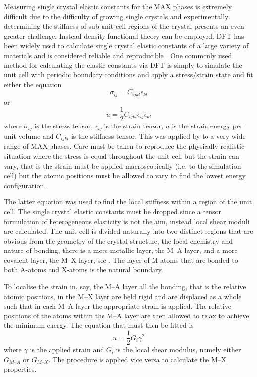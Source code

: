 Measuring single crystal elastic constants for the MAX phases is extremely difficult due to the difficulty of growing single crystals and experimentally determining the stiffness of sub-unit cell regions of the crystal presents an even greater challenge. Instead density functional theory can be employed. DFT has been widely used to calculate single crystal elastic constants of a large variety of materials and is considered reliable and reproducible \cite{Lejaeghere2016}. One commonly used method for calculating the elastic constants via DFT is simply to simulate the unit cell with periodic boundary conditions and apply a stress/strain state and fit either the equation
\begin{equation}
\sigma_{ij} = C_{ijkl} \epsilon_{kl}
\end{equation}
or 
\begin{equation}
u = \frac{1}{2} C_{ijkl} \epsilon_{ij} \epsilon_{kl}
\end{equation}
where $\sigma_{ij}$ is the stress tensor, $\epsilon_{ij}$ is the strain tensor, $u$ is the strain energy per unit volume and $C_{ijkl}$ is the stiffness tensor. This was applied by \citet{Aryal2014} to a very wide range of MAX phases. Care must be taken to reproduce the physically realistic situation where the stress is equal throughout the unit cell but the strain can vary, that is the strain must be applied macroscopically (i.e. to the simulation cell) but the atomic positions must be allowed to vary to find the lowest energy configuration.

The latter equation was used to find the local stiffness within a region of the unit cell. The single crystal elastic constants must be dropped since a tensor formulation of heterogeneous elasticity is not the aim, instead local shear moduli are calculated. The unit cell is divided naturally into two distinct regions that are obvious from the geometry of the crystal structure, the local chemistry and nature of bonding, there is a more metallic layer, the M--A layer, and a more covalent layer, the M--X layer, see \label{fig:fig:MAX_unit_cells}. The layer of M-atoms that are bonded to both A-atoms and X-atoms is the natural boundary.

To localise the strain in, say, the M--A layer all the bonding, that is the relative atomic positions, in the M--X layer are held rigid and are displaced as a whole such that in each M--A layer the appropriate strain is applied. The relative positions of the atoms within the M--A layer are then allowed to relax to achieve the minimum energy. The equation that must then be fitted is
\begin{equation}
u = \frac{1}{2} G_{i} \gamma^2
\end{equation}
where $\gamma$ is the applied strain and $G_i$ is the local shear modulus, namely either $G_{M\text{--}A}$ or $G_{M\text{--}X}$. The procedure is applied vice versa to calculate the M--X properties.




